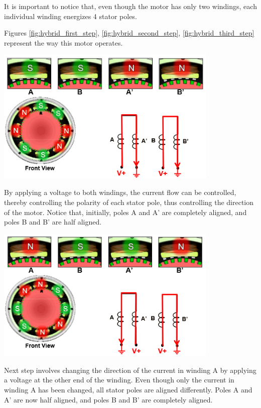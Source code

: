 It is important to notice that, even though the motor has only two windings, each individual winding energizes 4 stator poles.

Figures \ref{fig:hybrid_first_step},  \ref{fig:hybrid_second_step}, \ref{fig:hybrid_third_step} represent the way this motor operates.

\begin{center}
	\includegraphics[width=0.8\textwidth]{figures/move/motor32}
	\label{fig:hybrid_first_step}
\end{center}
\newpage
By applying a voltage to both windings, the current flow can be controlled, thereby controlling the polarity of each stator pole, thus controlling the direction of the motor. Notice that, initially, poles A and A’ are completely aligned, and poles B and B’ are half aligned. 

\begin{center}
	\includegraphics[width=0.8\textwidth]{figures/move/motor33}
	\label{fig:hybrid_second_step}
\end{center}

Next step involves changing the direction of the current in winding A by applying a voltage at the other end of the winding. Even though only the current in winding A has been changed, all stator poles are aligned differently. Poles A and A’ are now half aligned, and poles B and B’ are completely aligned.

